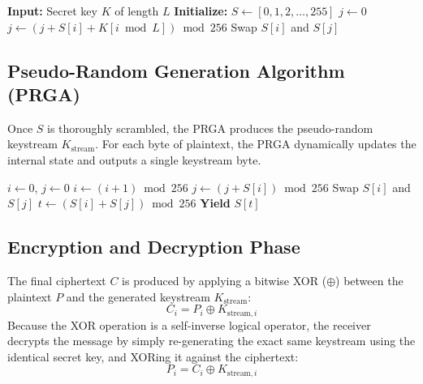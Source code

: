 \documentclass[12pt,a4paper]{report}
\begin{document}
\begin{algorithm}[H]
\caption{RC4 Key Scheduling Algorithm (KSA)}
\label{alg:ksa}
\begin{algorithmic}[1]
\STATE \textbf{Input:} Secret key $K$ of length $L$
\STATE \textbf{Initialize:} $S \leftarrow [0, 1, 2, \dots, 255]$
\STATE $j \leftarrow 0$
    \STATE $j \leftarrow (j + S[i] + K[i \bmod L]) \bmod 256$
    \STATE Swap $S[i]$ and $S[j]$
\ENDFOR
\end{algorithmic}
\end{algorithm}

\subsection{Pseudo-Random Generation Algorithm (PRGA)}
Once $S$ is thoroughly scrambled, the PRGA produces the pseudo-random keystream $K_{\text{stream}}$. For each byte of plaintext, the PRGA dynamically updates the internal state and outputs a single keystream byte.

\begin{algorithm}[H]
\caption{RC4 Pseudo-Random Generation Algorithm (PRGA)}
\label{alg:prga}
\begin{algorithmic}[1]
\STATE $i \leftarrow 0$, $j \leftarrow 0$
    \STATE $i \leftarrow (i + 1) \bmod 256$
    \STATE $j \leftarrow (j + S[i]) \bmod 256$
    \STATE Swap $S[i]$ and $S[j]$
    \STATE $t \leftarrow (S[i] + S[j]) \bmod 256$
    \STATE \textbf{Yield} $S[t]$ 
\ENDWHILE
\end{algorithmic}
\end{algorithm}

\subsection{Encryption and Decryption Phase}
The final ciphertext $C$ is produced by applying a bitwise XOR ($\oplus$) between the plaintext $P$ and the generated keystream $K_{\text{stream}}$:
$$C_i = P_i \oplus K_{\text{stream}, i}$$
Because the XOR operation is a self-inverse logical operator, the receiver decrypts the message by simply re-generating the exact same keystream using the identical secret key, and XORing it against the ciphertext:
$$P_i = C_i \oplus K_{\text{stream}, i}$$
\end{document}
